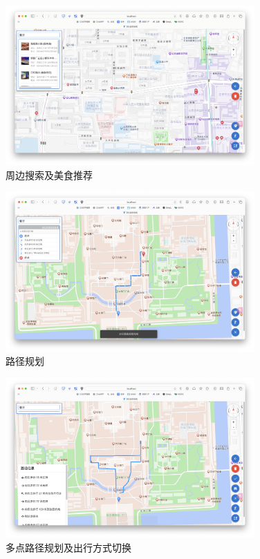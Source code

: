 \documentclass{ctexart}
\begin{document}
\begin{figure}[htbp]
    \centering
    \includegraphics[width=0.85\textwidth]{figure/search.png}
    \caption{周边搜索及美食推荐}
\end{figure}

\begin{figure}[htbp]
    \centering
    \includegraphics[width=0.85\textwidth]{figure/route.png}
    \caption{路径规划}
\end{figure}

\begin{figure}[htbp]
    \centering
    \includegraphics[width=0.85\textwidth]{figure/multi.png}
    \caption{多点路径规划及出行方式切换}
\end{figure}
\end{document}
